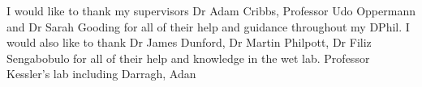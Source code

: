 I would like to thank my supervisors Dr Adam Cribbs, Professor Udo Oppermann and Dr Sarah Gooding for all of their help and guidance throughout my DPhil. I would also like to thank Dr James Dunford, Dr Martin Philpott, Dr Filiz Sengabobulo for all of their help and knowledge in the wet lab. Professor Kessler's lab including Darragh, Adan

